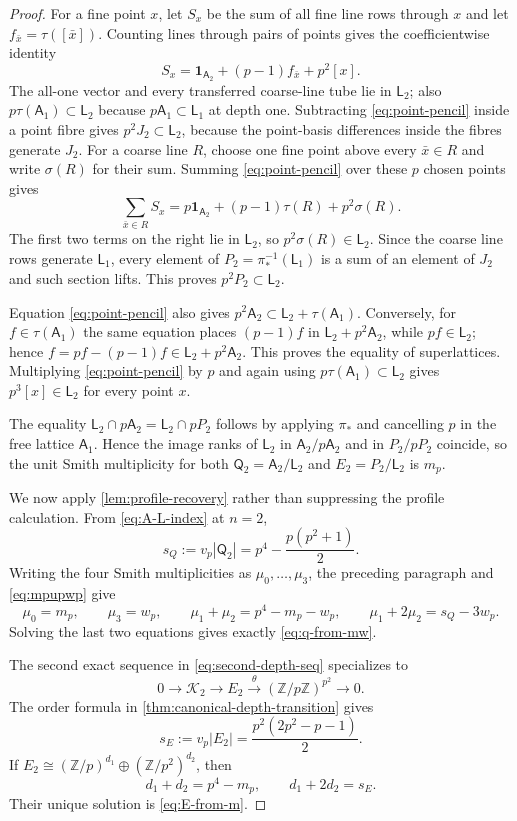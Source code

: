 \documentclass[12pt,a4paper]{article}
\theoremstyle{definition}
\newcommand{\Z}{\mathbb Z}
\newcommand{\A}{\mathsf A}
\newcommand{\LL}{\mathsf L}
\newcommand{\QQ}{\mathsf Q}
\newcommand{\vp}{v_p}
\begin{document}
\begin{proof}
For a fine point $x$, let $S_x$ be the sum of all fine line rows through
$x$ and let $f_{\bar x}=\tau([\bar x])$.  Counting lines through pairs of
points gives the coefficientwise identity
\begin{equation}\label{eq:point-pencil}
 S_x=\mathbf1_{\A_2}+(p-1)f_{\bar x}+p^2[x].
\end{equation}
The all-one vector and every transferred coarse-line tube lie in $\LL_2$;
also $p\tau(\A_1)\subset\LL_2$ because $p\A_1\subset\LL_1$ at depth one.
Subtracting \eqref{eq:point-pencil} inside a point fibre gives
$p^2J_2\subset\LL_2$, because the point-basis differences inside the fibres
generate $J_2$.  For a coarse line $R$, choose one fine point above every
$\bar x\in R$ and write $\sigma(R)$ for their sum.  Summing
\eqref{eq:point-pencil} over these $p$ chosen points gives
\[
 \sum_{\bar x\in R}S_x
 =p\mathbf1_{\A_2}+(p-1)\tau(R)+p^2\sigma(R).
\]
The first two terms on the right lie in $\LL_2$, so
$p^2\sigma(R)\in\LL_2$.  Since the coarse line rows generate $\LL_1$, every
element of $P_2=\pi_*^{-1}(\LL_1)$ is a sum of an element of $J_2$ and such
section lifts.  This proves $p^2P_2\subset\LL_2$.

Equation \eqref{eq:point-pencil} also gives
$p^2\A_2\subset\LL_2+\tau(\A_1)$.  Conversely, for
$f\in\tau(\A_1)$ the same equation places $(p-1)f$ in
$\LL_2+p^2\A_2$, while $pf\in\LL_2$; hence
$f=pf-(p-1)f\in\LL_2+p^2\A_2$.  This proves the equality of superlattices.
Multiplying \eqref{eq:point-pencil} by $p$ and again using
$p\tau(\A_1)\subset\LL_2$ gives $p^3[x]\in\LL_2$ for every point $x$.

The equality
$\LL_2\cap p\A_2=\LL_2\cap pP_2$ follows by applying $\pi_*$ and cancelling
$p$ in the free lattice $\A_1$.  Hence the image ranks of $\LL_2$ in
$\A_2/p\A_2$ and in $P_2/pP_2$ coincide, so the unit Smith multiplicity for
both $\QQ_2=\A_2/\LL_2$ and $E_2=P_2/\LL_2$ is $m_p$.

We now apply \cref{lem:profile-recovery} rather than suppressing the profile
calculation.  From \eqref{eq:A-L-index} at $n=2$,
\[
 s_Q:=\vp|\QQ_2|=p^4-\frac{p(p^2+1)}2.
\]
Writing the four Smith multiplicities as $\mu_0,\ldots,\mu_3$, the preceding
paragraph and \eqref{eq:mpupwp} give
\[
 \mu_0=m_p,\qquad \mu_3=w_p,
 \qquad \mu_1+\mu_2=p^4-m_p-w_p,
 \qquad \mu_1+2\mu_2=s_Q-3w_p.
\]
Solving the last two equations gives exactly \eqref{eq:q-from-mw}.

The second exact sequence in \eqref{eq:second-depth-seq} specializes to
\begin{equation}\label{eq:depth-two-kernel-sequence}
 0\longrightarrow\mathcal K_2\longrightarrow E_2
 \xrightarrow{\theta}(\Z/p\Z)^{p^2}\longrightarrow0.
\end{equation}
The order formula in \cref{thm:canonical-depth-transition} gives
\[
 s_E:=\vp|E_2|=\frac{p^2(2p^2-p-1)}2.
\]
If $E_2\cong(\Z/p)^{d_1}\oplus(\Z/p^2)^{d_2}$, then
\[
 d_1+d_2=p^4-m_p,\qquad d_1+2d_2=s_E.
\]
Their unique solution is \eqref{eq:E-from-m}.


\end{proof}
\end{document}
